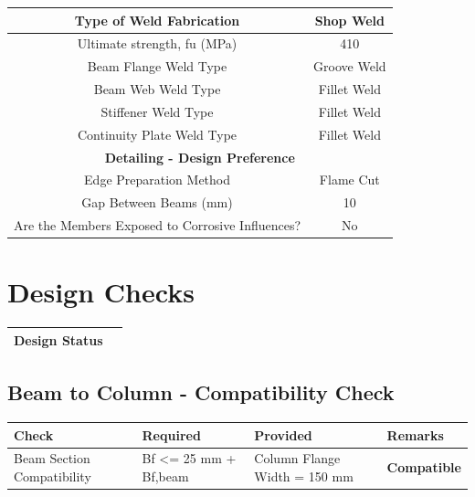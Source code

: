 \documentclass{article}%
\begin{document}
\begin{longtable}{|p{5cm}|p{2.5cm}|p{1.5cm}|p{3cm}|p{3.5cm}|}
\hline%
\hline%
\multicolumn{3}{|c|}{Type of Weld Fabrication}&\multicolumn{2}{|c|}{Shop Weld}\\%
\hline%
\hline%
\multicolumn{3}{|c|}{Ultimate strength, fu (MPa) }&\multicolumn{2}{|c|}{410}\\%
\hline%
\hline%
\multicolumn{3}{|c|}{Beam Flange Weld Type}&\multicolumn{2}{|c|}{Groove Weld}\\%
\hline%
\hline%
\multicolumn{3}{|c|}{Beam Web Weld Type}&\multicolumn{2}{|c|}{Fillet Weld}\\%
\hline%
\hline%
\multicolumn{3}{|c|}{Stiffener Weld Type}&\multicolumn{2}{|c|}{Fillet Weld}\\%
\hline%
\hline%
\multicolumn{3}{|c|}{Continuity Plate Weld Type}&\multicolumn{2}{|c|}{Fillet Weld}\\%
\hline%
\hline%
\multicolumn{5}{|c|}{\textbf{Detailing {-} Design Preference}}\\%
\hline%
\hline%
\multicolumn{3}{|c|}{Edge Preparation Method}&\multicolumn{2}{|c|}{Flame Cut}\\%
\hline%
\hline%
\multicolumn{3}{|c|}{Gap Between Beams (mm)}&\multicolumn{2}{|c|}{10}\\%
\hline%
\hline%
\multicolumn{3}{|c|}{Are the Members Exposed to Corrosive Influences?}&\multicolumn{2}{|c|}{No}\\%
\hline%
\end{longtable}

%
%
\newpage%
\section{Design Checks}%
\label{sec:DesignChecks}%
\renewcommand{\arraystretch}{1.2}%
\begin{tabularx}{\textwidth}{|>{\centering}p{12.5cm}|>{\centering\arraybackslash}X|}%
\hline%
\textbf{Design Status}&\cellcolor{OsdagGreen}{\textbf{Pass}}\\%
\hline%
\end{tabularx}%
\subsection{Beam to Column {-} Compatibility Check}%
\label{subsec:BeamtoColumn{-}CompatibilityCheck}%
\renewcommand{\arraystretch}{1.2}%
\begin{longtable}{|p{4cm}|p{3.5cm}|p{6.5cm}|p{2cm}|}%
\hline%
\rowcolor{OsdagGreen}%
Check&Required&Provided&Remarks\\%
\hline%
\endhead%
\hline%
Beam Section Compatibility&Bf <= 25 mm + Bf,beam&Column Flange Width = 150 mm&\textcolor{OsdagGreen}{%
\textbf{Compatible}%
}\\%
\hline%
\end{longtable}
\end{document}
